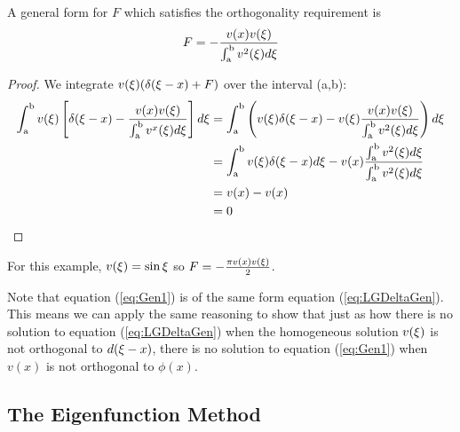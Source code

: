     \begin{theorem}
        A general form for \(F\) which satisfies the orthogonality requirement is
    \begin{equation*}
        F=-\frac{v(x)v(\xi)}{\int_{\mathrm{a}}^{\mathrm{b}}v^2(\xi)d\xi}
    \end{equation*}
    \end{theorem}
    \begin{proof}
        We integrate \(v(\xi)(\delta(\xi-x)+F)\) over the interval (a,b):
        \begin{equation*}
            \begin{split}
                \int_\mathrm{a}^\mathrm{b} v(\xi)\left[\delta(\xi-x) - \frac{v(x)v(\xi)}{\int_{\mathrm{a}}^{\mathrm{b}}v^x(\xi)d\xi} \right]d\xi &= \int_\mathrm{a}^\mathrm{b} \left(v(\xi)\delta(\xi-x) - v(\xi)\frac{v(x)v(\xi)}{\int_{\mathrm{a}}^{\mathrm{b}}v^2(\xi)d\xi} \right)d\xi \\
                &=\int_\mathrm{a}^\mathrm{b} v(\xi)\delta(\xi-x)d\xi - v(x)\frac{\int_{\mathrm{a}}^{\mathrm{b}}v^2(\xi)d\xi}{\int_{\mathrm{a}}^{\mathrm{b}}v^2(\xi)d\xi}\\
                &= v(x)-v(x)\\
                &=0
            \end{split}
        \end{equation*}
    \end{proof}

    For this example, \(v(\xi)= \sin \xi\) so \(F=-\frac{\pi v(x)v(\xi)}{2}\).

    Note that equation (\ref{eq:Gen1}) is of the same form equation (\ref{eq:LGDeltaGen}). This means we can apply the same reasoning to show that just as how there is no solution to equation (\ref{eq:LGDeltaGen}) when the homogeneous solution \(v(\xi)\) is not orthogonal to \(d(\xi-x)\), there is no solution to equation (\ref{eq:Gen1}) when \(v(x)\) is not orthogonal to \(\phi(x)\). 
\subsection{The Eigenfunction Method}